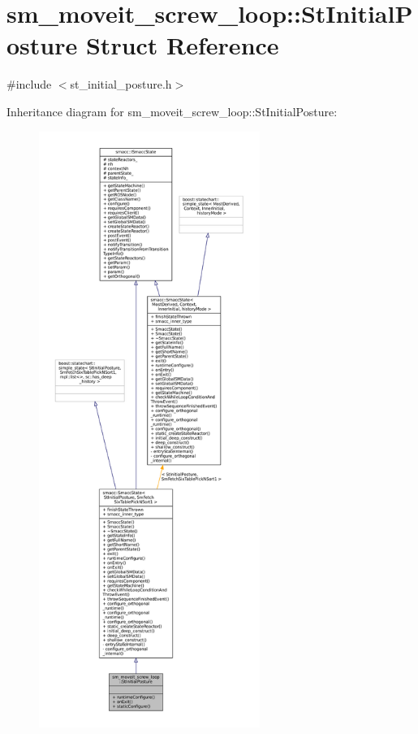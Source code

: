 \hypertarget{structsm__moveit__screw__loop_1_1StInitialPosture}{}\section{sm\+\_\+moveit\+\_\+screw\+\_\+loop\+:\+:St\+Initial\+Posture Struct Reference}
\label{structsm__moveit__screw__loop_1_1StInitialPosture}


{\ttfamily \#include $<$st\+\_\+initial\+\_\+posture.\+h$>$}



Inheritance diagram for sm\+\_\+moveit\+\_\+screw\+\_\+loop\+:\+:St\+Initial\+Posture\+:
\nopagebreak
\begin{figure}[H]
\begin{center}
\leavevmode
\includegraphics[height=550pt]{structsm__moveit__screw__loop_1_1StInitialPosture__inherit__graph}
\end{center}
\end{figure}


